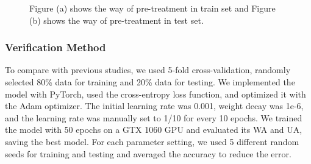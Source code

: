\documentclass[10pt, conference, compsocconf]{IEEEtran}
\begin{document}
\begin{figure}[h]
	
	\centering
	\subfigcapskip=5pt
	\caption{Figure (a) shows the way of pre-treatment in train set and Figure (b) shows the way of pre-treatment in test set.}
	\label{pre-treat}
	
\end{figure}

\subsubsection{Verification Method}
To compare with previous studies, we used 5-fold cross-validation, randomly selected 80\% data for training and 20\% data for testing. We implemented the model with PyTorch, used the cross-entropy loss function, and optimized it with the Adam optimizer. The initial learning rate was 0.001, weight decay was 1e-6, and the learning rate was manually set to 1/10 for every 10 epochs. We trained the model with 50 epochs on a GTX 1060 GPU and evaluated its WA and UA, saving the best model. For each parameter setting, we used 5 different random seeds for training and testing and averaged the accuracy to reduce the error.
\end{document}
